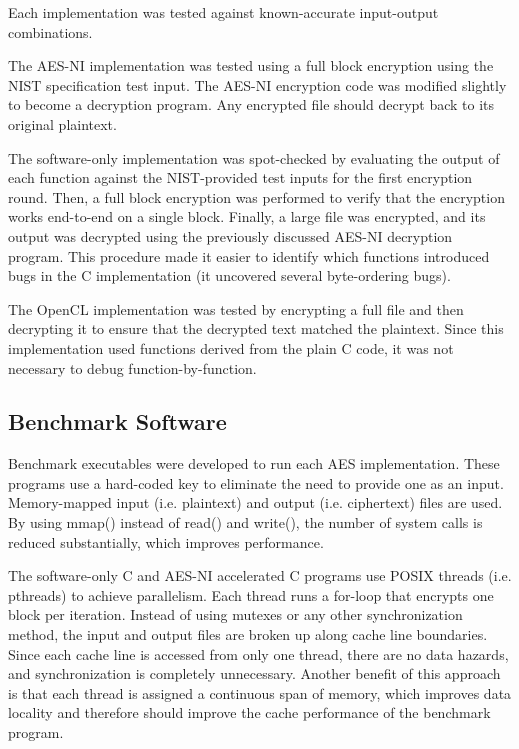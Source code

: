 \documentclass[a4paper,10pt]{article}
\begin{document}
Each implementation was tested against known-accurate input-output combinations.

The AES-NI implementation was tested using a full block encryption using the NIST specification test input.  The AES-NI encryption code was modified slightly to become a decryption program.  Any encrypted file should decrypt back to its original plaintext.

The software-only implementation was spot-checked by evaluating the output of each function against the NIST-provided test inputs for the first encryption round.  Then, a full block encryption was performed to verify that the encryption works end-to-end on a single block.  Finally, a large file was encrypted, and its output was decrypted using the previously discussed AES-NI decryption program.  This procedure made it easier to identify which functions introduced bugs in the C implementation (it uncovered several byte-ordering bugs).

The OpenCL implementation was tested by encrypting a full file and then decrypting it to ensure that the decrypted text matched the plaintext.  Since this implementation used functions derived from the plain C code, it was not necessary to debug function-by-function.

\subsection{Benchmark Software}

Benchmark executables were developed to run each AES implementation.  These programs use a hard-coded key to eliminate the need to provide one as an input.  Memory-mapped input (i.e. plaintext) and output (i.e. ciphertext) files are used.  By using mmap() instead of read() and write(), the number of system calls is reduced substantially, which improves performance.

The software-only C and AES-NI accelerated C programs use POSIX threads (i.e. pthreads) to achieve parallelism.  Each thread runs a for-loop that encrypts one block per iteration.  Instead of using mutexes or any other synchronization method, the input and output files are broken up along cache line boundaries.  Since each cache line is accessed from only one thread, there are no data hazards, and synchronization is completely unnecessary.  Another benefit of this approach is that each thread is assigned a continuous span of memory, which improves data locality and therefore should improve the cache performance of the benchmark program.
\end{document}
